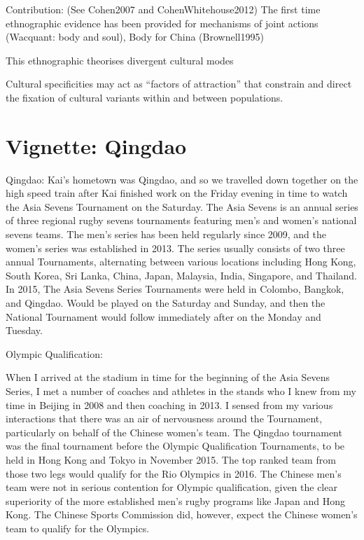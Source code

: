 Contribution: (See Cohen2007 and CohenWhitehouse2012)
The first time ethnographic evidence has been provided for mechanisms of joint actions
(Wacquant: body and soul), Body for China (Brownell1995)

This ethnographic theorises divergent cultural modes


Cultural specificities may act as ``factors of attraction'' \citep{Sperber2014} that constrain and direct the fixation of cultural variants within and between populations.

\section{Vignette: Qingdao}
Qingdao:
Kai's hometown was Qingdao, and so we travelled down together on the high speed train after Kai finished work on the Friday evening in time to watch the Asia Sevens Tournament on the Saturday.  The Asia Sevens is an annual series of three regional rugby sevens tournaments featuring men's and women's national sevens teams.  The men's series has been held regularly since 2009, and the women's series was established in 2013. The series usually consists of two three annual Tournaments, alternating between various locations including Hong Kong, South Korea, Sri Lanka, China, Japan, Malaysia, India, Singapore, and Thailand.  In 2015, The Asia Sevens Series Tournaments were held in Colombo, Bangkok, and Qingdao. Would be played on the Saturday and Sunday, and then the National Tournament would follow immediately after on the Monday and Tuesday.


Olympic Qualification:

When I arrived at the stadium in time for the beginning of the Asia Sevens Series, I met a number of coaches and athletes in the stands who I knew from my time in Beijing in 2008 and then coaching in 2013. I sensed from my various interactions that there was an air of nervousness around the Tournament, particularly on behalf of the Chinese women's team.   The Qingdao tournament was the final tournament before the Olympic Qualification Tournaments, to be held in Hong Kong and Tokyo in November 2015.  The top ranked team from those two legs would qualify for the Rio Olympics in 2016.  The Chinese men's team were not in serious contention for Olympic qualification, given the clear superiority of the more established men's rugby programs like Japan and Hong Kong. The Chinese Sports Commission did, however, expect the Chinese women's team to qualify for the Olympics.

